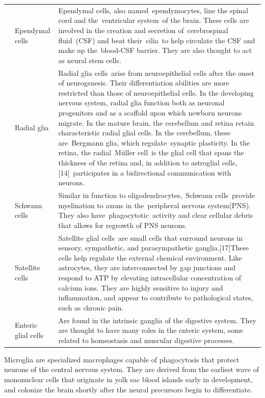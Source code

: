 \begin{longtable}[t]{>{\raggedright\arraybackslash}p{5em}>{\raggedright\arraybackslash}p{10em}>{\raggedright\arraybackslash}p{35em}}
 & Ependymal cells & Ependymal cells, also named ependymocytes, line the spinal cord and the ventricular system of the brain. These cells are involved in the creation and secretion of cerebrospinal fluid (CSF) and beat their cilia to help circulate the CSF and make up the blood-CSF barrier. They are also thought to act as neural stem cells.\\

\rowcolor{gray!6}  \multirow{-7}{5em}{\raggedright\arraybackslash CNS} & Radial glia & Radial glia cells arise from neuroepithelial cells after the onset of neurogenesis. Their differentiation abilities are more restricted than those of neuroepithelial cells. In the developing nervous system, radial glia function both as neuronal progenitors and as a scaffold upon which newborn neurons migrate. In the mature brain, the cerebellum and retina retain characteristic radial glial cells. In the cerebellum, these are Bergmann glia, which regulate synaptic plasticity. In the retina, the radial Müller cell is the glial cell that spans the thickness of the retina and, in addition to astroglial cells,[14] participates in a bidirectional communication with neurons.\\
\cmidrule{1-3}
 & Schwann cells & Similar in function to oligodendrocytes, Schwann cells provide myelination to axons in the peripheral nervous system(PNS). They also have phagocytotic activity and clear cellular debris that allows for regrowth of PNS neurons.\\

\rowcolor{gray!6}   & Satellite cells & Satellite glial cells are small cells that surround neurons in sensory, sympathetic, and parasympathetic ganglia.[17]These cells help regulate the external chemical environment. Like astrocytes, they are interconnected by gap junctions and respond to ATP by elevating intracellular concentration of calcium ions. They are highly sensitive to injury and inflammation, and appear to contribute to pathological states, such as chronic pain.\\

\multirow{-3}{5em}{\raggedright\arraybackslash PNS} & Enteric glial cells & Are found in the intrinsic ganglia of the digestive system. They are thought to have many roles in the enteric system, some related to homeostasis and muscular digestive processes.\\
\bottomrule
\end{longtable}

Microglia are specialized macrophages capable of phagocytosis that protect neurons of the central nervous system. They are derived from the earliest wave of mononuclear cells that originate in yolk sac blood islands early in development, and colonize the brain shortly after the neural precursors begin to differentiate.

